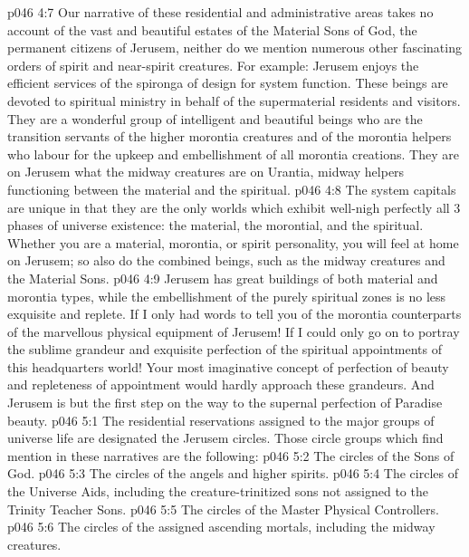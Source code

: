 \vs p046 4:7 \pc Our narrative of these residential and administrative areas takes no account of the vast and beautiful estates of the Material Sons of God, the permanent citizens of Jerusem, neither do we mention numerous other fascinating orders of spirit and near\hyp{}spirit creatures. For example: Jerusem enjoys the efficient services of the spironga of design for system function. These beings are devoted to spiritual ministry in behalf of the supermaterial residents and visitors. They are a wonderful group of intelligent and beautiful beings who are the transition servants of the higher morontia creatures and of the morontia helpers who labour for the upkeep and embellishment of all morontia creations. They are on Jerusem what the midway creatures are on Urantia, midway helpers functioning between the material and the spiritual.
\vs p046 4:8 The system capitals are unique in that they are the only worlds which exhibit well\hyp{}nigh perfectly all 3 phases of universe existence: the material, the morontial, and the spiritual. Whether you are a material, morontia, or spirit personality, you will feel at home on Jerusem; so also do the combined beings, such as the midway creatures and the Material Sons.
\vs p046 4:9 Jerusem has great buildings of both material and morontia types, while the embellishment of the purely spiritual zones is no less exquisite and replete. If I only had words to tell you of the morontia counterparts of the marvellous physical equipment of Jerusem! If I could only go on to portray the sublime grandeur and exquisite perfection of the spiritual appointments of this headquarters world! Your most imaginative concept of perfection of beauty and repleteness of appointment would hardly approach these grandeurs. And Jerusem is but the first step on the way to the supernal perfection of Paradise beauty.
\vs p046 5:1 The residential reservations assigned to the major groups of universe life are designated the Jerusem circles. Those circle groups which find mention in these narratives are the following:
\vs p046 5:2 \bibnobreakspace The circles of the Sons of God.
\vs p046 5:3 \bibnobreakspace The circles of the angels and higher spirits.
\vs p046 5:4 \bibnobreakspace The circles of the Universe Aids, including the creature\hyp{}trinitized sons not assigned to the Trinity Teacher Sons.
\vs p046 5:5 \bibnobreakspace The circles of the Master Physical Controllers.
\vs p046 5:6 \bibnobreakspace The circles of the assigned ascending mortals, including the midway creatures.

